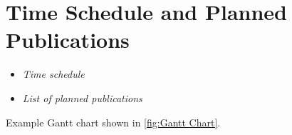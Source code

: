 \section{Time Schedule and Planned Publications}
\label{sec:Time Schedule and Planned Publications}



\begin{itemize}
	\item \emph{Time schedule}
	\item \emph{List of planned publications}
\end{itemize}

Example Gantt chart shown in \cref{fig:Gantt Chart}.
